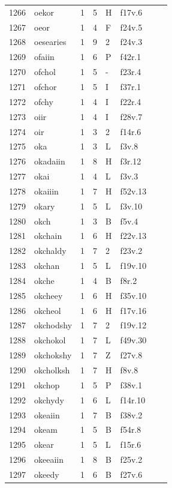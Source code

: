 \documentclass[11pt,a4paper]{article}
\begin{document}
\begin{landscape}
\begin{longtable}{@{}r>{\ttfamily}lrrl>{\ttfamily}l>{\raggedright\arraybackslash}p{80mm}>{\raggedright\arraybackslash}p{36mm}@{}}
1266 & oekor & 1 & 5 & H & f17v.6 &  & \\
1267 & oeor & 1 & 4 & F & f24v.5 &  & \\
1268 & oesearies & 1 & 9 & 2 & f24v.3 &  & \\
1269 & ofaiin & 1 & 6 & P & f42r.1 &  & \\
1270 & ofchol & 1 & 5 & - & f23r.4 &  & \\
1271 & ofchor & 1 & 5 & I & f37r.1 &  & \\
1272 & ofchy & 1 & 4 & I & f22r.4 &  & \\
1273 & oiir & 1 & 4 & I & f28v.7 &  & \\
1274 & oir & 1 & 3 & 2 & f14r.6 &  & \\
1275 & oka & 1 & 3 & L & f3v.8 &  & \\
1276 & okadaiin & 1 & 8 & H & f3r.12 &  & \\
1277 & okai & 1 & 4 & L & f3v.3 &  & \\
1278 & okaiiin & 1 & 7 & H & f52v.13 &  & \\
1279 & okary & 1 & 5 & L & f3v.10 &  & \\
1280 & okch & 1 & 3 & B & f5v.4 &  & \\
1281 & okchain & 1 & 6 & H & f22v.13 &  & \\
1282 & okchaldy & 1 & 7 & 2 & f23v.2 &  & \\
1283 & okchan & 1 & 5 & L & f19v.10 &  & \\
1284 & okche & 1 & 4 & B & f8r.2 &  & \\
1285 & okcheey & 1 & 6 & H & f35v.10 &  & \\
1286 & okcheol & 1 & 6 & H & f17v.16 &  & \\
1287 & okchodshy & 1 & 7 & 2 & f19v.12 &  & \\
1288 & okchokol & 1 & 7 & L & f49v.30 &  & \\
1289 & okchokshy & 1 & 7 & Z & f27v.8 &  & \\
1290 & okcholksh & 1 & 7 & H & f8v.8 &  & \\
1291 & okchop & 1 & 5 & P & f38v.1 &  & \\
1292 & okchydy & 1 & 6 & L & f14r.10 &  & \\
1293 & okeaiin & 1 & 7 & B & f38v.2 &  & \\
1294 & okeam & 1 & 5 & B & f54r.8 &  & \\
1295 & okear & 1 & 5 & L & f15r.6 &  & \\
1296 & okeeaiin & 1 & 8 & B & f25v.2 &  & \\
1297 & okeedy & 1 & 6 & B & f27v.6 &  & \\

\end{longtable}
\end{landscape}
\end{document}
